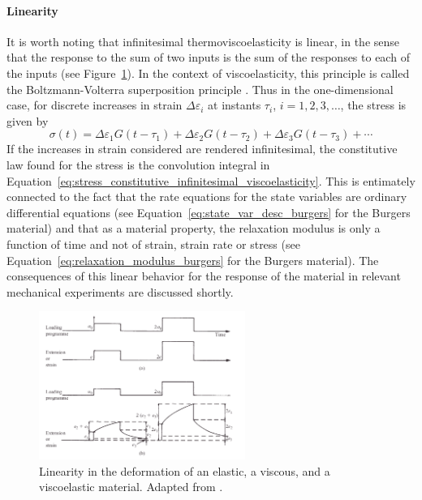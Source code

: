 \paragraph{Linearity}
It is worth noting that infinitesimal thermoviscoelasticity is linear, in the sense that the response to the sum of two inputs is the sum of the responses to each of the inputs (see Figure~\ref{fig:linearity}).
In the context of viscoelasticity, this principle is called the Boltzmann-Volterra superposition principle \citep{wardIntroductionMechanicalProperties2004}.
Thus in the one-dimensional case, for discrete increases in strain $\Delta \varepsilon_i$ at instants $\tau_i$, $i=1,2,3,\dots$, the stress is given by
\begin{equation}
	\sigma (t) = \Delta \varepsilon_1 G(t - \tau_1) + \Delta \varepsilon_2 G(t - \tau_2) + \Delta \varepsilon_3 G(t - \tau_3) + \cdots
\end{equation}
If the increases in strain considered are rendered infinitesimal, the constitutive law found for the stress is the convolution integral in Equation~\eqref{eq:stress_constitutive_infinitesimal_viscoelasticity}.
This is entimately connected to the fact that the rate equations for the state variables are ordinary differential equations (see Equation~\eqref{eq:state_var_desc_burgers} for the Burgers material) and that as a material property, the relaxation modulus is only a function of time and not of strain, strain rate or stress (see Equation~\eqref{eq:relaxation_modulus_burgers} for the Burgers material).
The consequences of this linear behavior for the response of the material in relevant mechanical experiments are discussed shortly.
\begin{figure}[hbtp]
  \centering
  \includegraphics[width=0.6\textwidth]{figures/linearity}
  \caption{Linearity in the deformation of an elastic, a viscous, and a viscoelastic material. Adapted from \cite{wardIntroductionMechanicalProperties2004}.}
\label{fig:linearity}
\end{figure}

